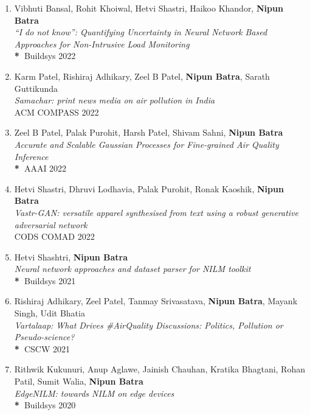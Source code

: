 \documentclass[letter,10pt]{article}
\begin{document}
\begin{itemize}
\begin{enumerate}
\item{Vibhuti Bansal, Rohit Khoiwal,
  Hetvi Shastri,
  Haikoo Khandor,
  \textbf{Nipun Batra}}\\
    \textit{``I do not know'': Quantifying Uncertainty in Neural Network 
  Based Approaches for Non-Intrusive Load Monitoring}\\
      \textbf{*~}{Buildsys 2022}


\item{Karm Patel, Rishiraj Adhikary, Zeel B Patel, \textbf{Nipun Batra}, Sarath Guttikunda}\\
    \textit{Samachar: print news media on air pollution in India}\\
    {ACM COMPASS 2022}

 \item{Zeel B Patel, Palak Purohit, Harsh Patel, Shivam Sahni, \textbf{Nipun Batra}}\\
    \textit{Accurate and Scalable Gaussian Processes for Fine-grained Air Quality Inference}\\
    \textbf{*~}{AAAI 2022}

\item{Hetvi Shastri, Dhruvi Lodhavia, Palak Purohit, Ronak Kaoshik, \textbf{Nipun Batra}
}\\
\textit{Vastr-GAN: versatile apparel synthesised from text using a robust generative adversarial network}\\
    {CODS COMAD 2022}


   

    \item{Hetvi Shashtri, \textbf{Nipun Batra}}\\
    \textit{Neural network approaches and dataset parser for NILM toolkit}\\
    \textbf{*~}{Buildsys 2021}

    
    
    \item{Rishiraj Adhikary, Zeel Patel, Tanmay Srivasatava, \textbf{Nipun Batra}, Mayank Singh, Udit Bhatia}\\
    \textit{Vartalaap: What Drives \#AirQuality Discussions: Politics, Pollution or Pseudo-science?}\\
    \textbf{*~}{CSCW 2021}
    
    \item{Rithwik Kukunuri, Anup Aglawe, Jainish Chauhan, Kratika Bhagtani, Rohan Patil, Sumit Walia, \textbf{Nipun Batra}}\\
    \textit{EdgeNILM: towards NILM on edge devices}\\
    \textbf{*~}{Buildsys 2020}
    

\end{enumerate}
\end{itemize}
\end{document}
